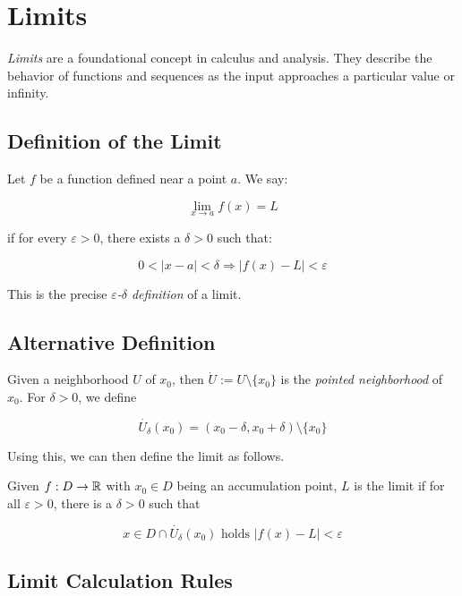 \chapter{Limits}

\emph{Limits} are a foundational concept in calculus and analysis. They describe the behavior of 
functions and sequences as the input approaches a particular value or infinity.

\section{Definition of the Limit}

Let \(f\) be a function defined near a point \(a\). We say:

\[
    \lim_{x \to a} f(x) = L
\]

if for every \(\varepsilon > 0\), there exists a \(\delta > 0\) such that:

\[
    0 < |x - a| < \delta \Rightarrow |f(x) - L| < \varepsilon
\]

This is the precise \emph{\(\varepsilon\)-\(\delta\) definition} of a limit.

\section{Alternative Definition}

Given a neighborhood \(U\) of \(x_0\), then \(\dot{U}:= U \setminus \{x_0\} \) is the \emph{pointed neighborhood} 
of \(x_0\). For \(\delta > 0\), we define 

\[
    \dot{U_{\delta}}(x_0) = (x_0 - \delta, x_0 + \delta) \setminus \{x_0\}
\]

Using this, we can then define the limit as follows.

Given \(f: D \to \mathbb{R}\) with \(x_0 \in D\) being an accumulation point, \(L\) is the limit if 
for all \(\varepsilon > 0 \), there is a \(\delta > 0\) such that 

\[
    x \in D \cap \dot{U_{\delta}}(x_0) \text{ holds } |f(x) - L | < \varepsilon 
\]

\section{Limit Calculation Rules}

